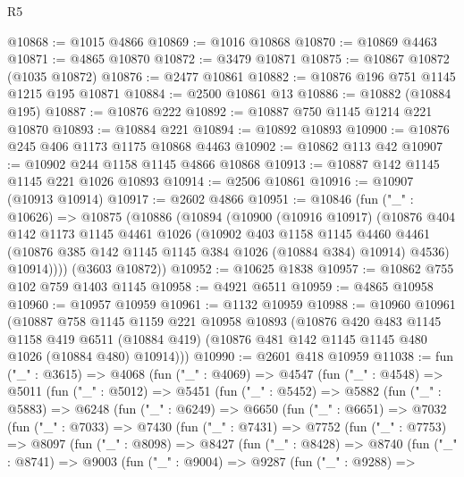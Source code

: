 \begin{lexlean}{R5}
\begin{coremodule}
@10868 := @1015 @4866
@10869 := @1016 @10868
@10870 := @10869 @4463
@10871 := @4865 @10870
@10872 := @3479 @10871
@10875 := @10867 @10872 (@1035 @10872)
@10876 := @2477 @10861
@10882 := @10876 @196 @751 @1145 @1215 @195 @10871
@10884 := @2500 @10861 @13
@10886 := @10882 (@10884 @195)
@10887 := @10876 @222
@10892 := @10887 @750 @1145 @1214 @221 @10870
@10893 := @10884 @221
@10894 := @10892 @10893
@10900 := @10876 @245 @406 @1173 @1175 @10868 @4463
@10902 := @10862 @113 @42
@10907 := @10902 @244 @1158 @1145 @4866 @10868
@10913 := @10887 @142 @1145 @1145 @221 @1026 @10893
@10914 := @2506 @10861
@10916 := @10907 (@10913 @10914)
@10917 := @2602 @4866
@10951 := @10846
    (fun ("_" : @10626) =>
    @10875
      (@10886
        (@10894
          (@10900
            (@10916 @10917)
            (@10876
              @404
              @142
              @1173
              @1145
              @4461
              @1026
              (@10902
                @403
                @1158
                @1145
                @4460
                @4461
                (@10876 @385 @142 @1145 @1145 @384 @1026 (@10884 @384) @10914)
                @4536)
              @10914))))
      (@3603 @10872))
@10952 := @10625 @1838
@10957 := @10862 @755 @102 @759 @1403 @1145
@10958 := @4921 @6511
@10959 := @4865 @10958
@10960 := @10957 @10959
@10961 := @1132 @10959
@10988 := @10960
    @10961
    (@10887
      @758
      @1145
      @1159
      @221
      @10958
      @10893
      (@10876
        @420
        @483
        @1145
        @1158
        @419
        @6511
        (@10884 @419)
        (@10876 @481 @142 @1145 @1145 @480 @1026 (@10884 @480) @10914)))
@10990 := @2601 @418 @10959
@11038 := fun ("_" : @3615) =>
  @4068
    (fun ("_" : @4069) =>
    @4547
      (fun ("_" : @4548) =>
      @5011
        (fun ("_" : @5012) =>
        @5451
          (fun ("_" : @5452) =>
          @5882
            (fun ("_" : @5883) =>
            @6248
              (fun ("_" : @6249) =>
              @6650
                (fun ("_" : @6651) =>
                @7032
                  (fun ("_" : @7033) =>
                  @7430
                    (fun ("_" : @7431) =>
                    @7752
                      (fun ("_" : @7753) =>
                      @8097
                        (fun ("_" : @8098) =>
                        @8427
                          (fun ("_" : @8428) =>
                          @8740
                            (fun ("_" : @8741) =>
                            @9003
                              (fun ("_" : @9004) =>
                              @9287
                                (fun ("_" : @9288) =>

\end{coremodule}
\end{lexlean}
